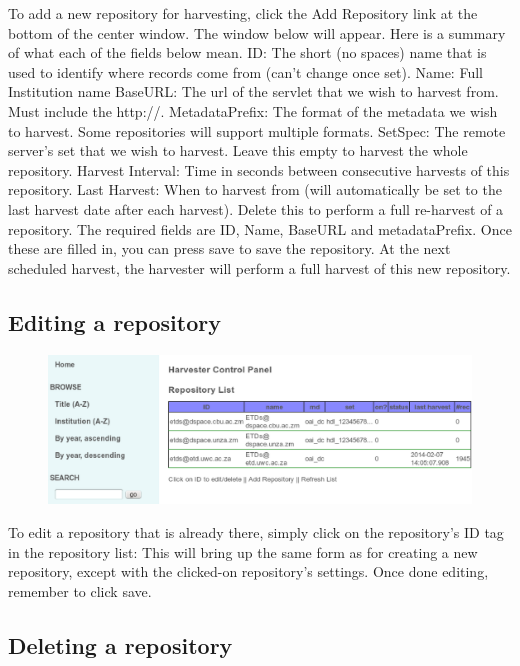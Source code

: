 \documentclass[a4paper,11pt]{article}
\begin{document}
To add a new repository for harvesting, click the Add Repository link at the bottom of the center window. The window below will appear. Here is a summary of what each of the fields below mean.
ID: The short (no spaces) name that is used to identify where records come from (can't change once set). Name: Full Institution name BaseURL: The url of the servlet that we wish to harvest from. Must include the http://. MetadataPrefix: The format of the metadata we wish to harvest. Some repositories will support multiple formats. SetSpec: The remote server's set that we wish to harvest. Leave this empty to harvest the whole repository. Harvest Interval: Time in seconds between consecutive harvests of this repository. Last Harvest: When to harvest from (will automatically be set to the last harvest date after each harvest). Delete this to perform a full re-harvest of a repository.
The required fields are ID, Name, BaseURL and metadataPrefix. Once these are filled in, you can press save to save the repository. At the next scheduled harvest, the harvester will perform a full harvest of this new repository.

\subsection{Editing a repository}

\begin{figure}
 \centering
 \includegraphics[width=\textwidth]{editing_repository_infomation_x.eps}
\end{figure}

To edit a repository that is already there, simply click on the repository's ID tag in the repository list:
This will bring up the same form as for creating a new repository, except with the clicked-on repository's settings. Once done editing, remember to click save.

\subsection{Deleting a repository}
\end{document}
